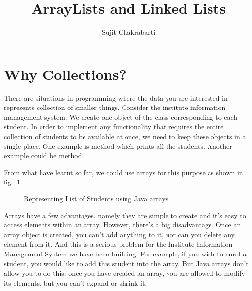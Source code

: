 \documentclass[12pt,a4paper]{article}
\author{Sujit Chakrabarti}
\title{ArrayLists and Linked Lists}
\date{}
\begin{document}

\newcommand{\highlight}[1]{{\color{Red}(#1)}}
\newcommand{\comment}[1]{{\color{Blue}#1}}


\maketitle

\section{Why Collections?}
There are situations in programming where the data you are interested in represents collection of smaller things. Consider the institute information management system. We create one object of the \lstinline@Student@ class corresponding to each student. In order to implement any functionality that requires the entire collection of students to be available at once, we need to keep these objects in a single place. One example is \lstinline@printStudentList@ method which prints all the students. Another example could be \lstinline@search@ method.

From what have learnt so far, we could use arrays for this purpose as shown in fig.~\ref{f:array}.

\begin{figure}[H]
	
\caption{Representing List of Students using Java arrays}
\label{f:array}
\end{figure}


Arrays have a few advantages, namely they are simple to create and it's easy to access elements within an array. However, there's a big disadvantage. Once an array object is created, you can't add anything to it, nor can you delete any element from it. And this is a serious problem for the Institute Information Management System we have been building. For example, if you wish to enrol a student, you would like to add this student into the array. But Java arrays don't allow you to do this: once you have created an array, you are allowed to modify its elements, but you can't expand or shrink it.
\end{document}
